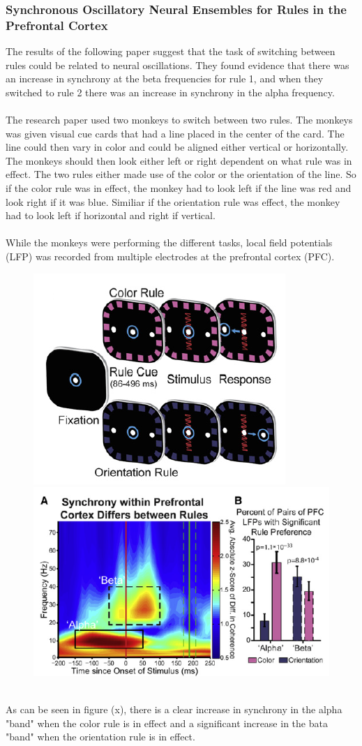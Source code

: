 \documentclass[11pt, a4paper]{article}
\begin{document}
\subsubsection{Synchronous Oscillatory Neural Ensembles
for Rules in the Prefrontal Cortex}
The results of the following paper suggest that the task of switching between rules could be related to neural oscillations. They found evidence that there was an increase in synchrony at the beta frequencies for rule 1, and when they switched to rule 2 there was an increase in synchrony in the alpha frequency.
\\
\\
The research paper used two monkeys to switch between two rules. The monkeys was given visual cue cards that had a line placed in the center of the card. The line could then vary in color and could be aligned either vertical or horizontally. The monkeys should then look either left or right dependent on what rule was in effect. The two rules either made use of the color or the orientation of the line. So if the color rule was in effect, the monkey had to look left if the line was red and look right if it was blue. Similiar if the orientation rule was effect, the monkey had to look left if horizontal and right if vertical.
\\
\\
While the monkeys were performing the different tasks, local field potentials (LFP) was recorded from multiple electrodes at the prefrontal cortex (PFC).
\begin{figure}[!ht]
\centering
\includegraphics[scale=0.5]{MonkeyRules}
\includegraphics[scale=0.5]{MonkeyResults}
\caption{}
\end{figure}
\\
As can be seen in figure (x), there is a clear increase in synchrony in the alpha "band" when the color rule is in effect and a significant increase in the bata "band" when the orientation rule is in effect.
\end{document}
